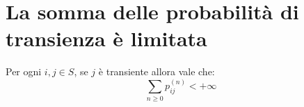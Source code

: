 \documentclass[\main/main.tex]{subfiles}
\begin{document}
\section{La somma delle probabilità di transienza è limitata}
\begin{observation}
  Per ogni \(i,j \in S\), se \(j\) è transiente allora vale che:
  \[
    \sum_{n \geq 0}p^{(n)}_{ij} < +\infty
  \]
\end{observation}
\end{document}
